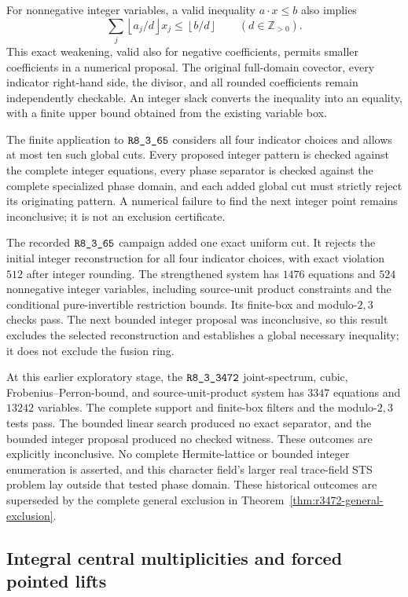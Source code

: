 For nonnegative integer variables, a valid inequality $a\cdot x\le b$
also implies
\[
 \sum_j\left\lfloor a_j/d\right\rfloor x_j
 \le\left\lfloor b/d\right\rfloor\qquad(d\in\mathbb Z_{>0}).
\]
This exact weakening, valid also for negative coefficients, permits
smaller coefficients in a numerical proposal.  The original full-domain
covector, every indicator right-hand side, the divisor, and all rounded
coefficients remain independently checkable.  An integer slack converts
the inequality into an equality, with a finite upper bound obtained
from the existing variable box.

The finite application to $\sha{R8_3_65}$ considers all four indicator
choices and allows at most ten such global cuts.  Every proposed integer
pattern is checked against the complete integer equations, every phase
separator is checked against the complete specialized phase domain, and
each added global cut must strictly reject its originating pattern.
A numerical failure to find the next integer point remains inconclusive;
it is not an exclusion certificate.

The recorded $\sha{R8_3_65}$ campaign added one exact uniform cut.  It
rejects the initial integer reconstruction for all four indicator
choices, with exact violation $512$ after integer rounding.  The
strengthened system has $1476$ equations and $524$ nonnegative integer
variables, including source-unit product constraints and the conditional
pure-invertible restriction bounds.  Its finite-box and modulo-$2,3$
checks pass.  The next bounded integer proposal was inconclusive, so
this result excludes the selected reconstruction and establishes a
global necessary inequality; it does not exclude the fusion ring.

At this earlier exploratory stage, the $\sha{R8_3_3472}$ joint-spectrum,
cubic, Frobenius--Perron-bound,
and source-unit-product system has $3347$ equations and $13242$ variables.
The complete support and finite-box filters and the modulo-$2,3$ tests
pass.  The bounded linear search produced no exact separator, and the
bounded integer proposal produced no checked witness.  These outcomes
are explicitly inconclusive.  No complete Hermite-lattice or bounded
integer enumeration is asserted, and this character field's larger
real trace-field STS problem lay outside that tested phase domain.
These historical outcomes are superseded by the complete general exclusion
in Theorem~\ref{thm:r3472-general-exclusion}.

\subsection{Integral central multiplicities and forced pointed lifts}
\label{subsec:frontier-quartic-integer}

